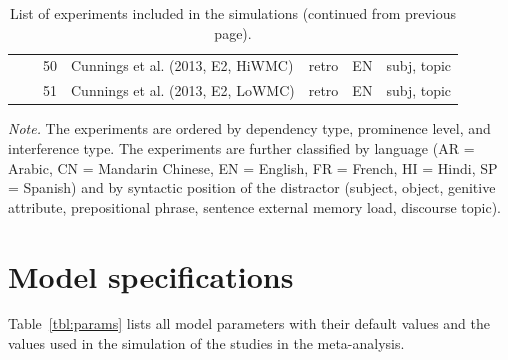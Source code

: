 \documentclass{cambridge7A}\usepackage[]{graphicx}\usepackage[]{color}
\begin{document}
\begin{subappendices}
\begin{table}[!htbp]
{\begin{tabular}{llrllll}
               &            & 50    & Cunnings et al. (2013, E2, HiWMC)   & retro   & EN   & subj, topic \\
               &            & 51    & Cunnings et al. (2013, E2, LoWMC)   & retro   & EN   & subj, topic \\
\end{tabular}
\begin{tablenotes}
\item \emph{Note.} The experiments are ordered by dependency type, prominence level, and interference type. 
The experiments are further classified by language (AR = Arabic, CN = Mandarin Chinese, EN = English, FR = French, HI = Hindi, SP = Spanish) and by syntactic position of the distractor (subject, object, genitive attribute, prepositional phrase, sentence external memory load, discourse topic). 
\end{tablenotes}
}
\caption{List of experiments included in the simulations (continued from previous page).}\label{tab:exps2}
\end{table}

\clearpage

\section{Model specifications}
\label{sec:modelappendix}
Table~\ref{tbl:params} lists all model parameters with their default values and the values used in the simulation of the studies in the meta-analysis.



\end{subappendices}
\end{document}
